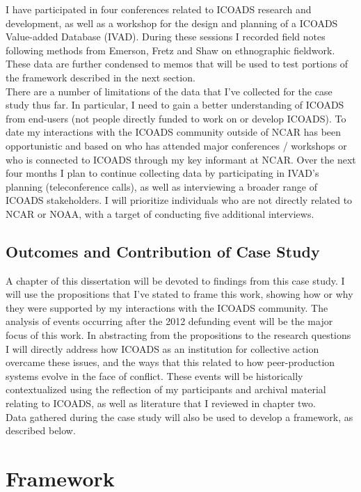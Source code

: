 \documentclass[thesis,tocnosub,noragright,centerchapter,12pt]{uiucecethesis09}
\begin{document}
{I have participated in four conferences related to ICOADS research and
development, as well as a workshop for the design and planning of a
ICOADS Value-added Database (IVAD). During these sessions I recorded
field notes following methods from Emerson, Fretz and Shaw \citeyearpar{emerson2011writing} on
ethnographic fieldwork. These data are further condensed to memos that
will be used to test portions of the framework described in the next
section.\\

There are a number of limitations of the data that I've collected for the case study thus far. In particular, I need to gain a better understanding of ICOADS from end-users (not people directly funded to work on or develop ICOADS). To date my interactions with the ICOADS community outside of NCAR has been opportunistic and based on who has attended major
conferences / workshops or who is connected to ICOADS through my key informant at NCAR. Over the next four months I plan to continue collecting data by participating in IVAD's planning (teleconference calls), as well as
interviewing a broader range of ICOADS stakeholders. I will
prioritize individuals who are not directly related to NCAR or NOAA, with a target of conducting five additional interviews.\\

\subsection*{Outcomes and Contribution of Case Study}
A chapter of this dissertation will be devoted to findings from this case study. I will use the propositions that I've stated to frame this work, showing how or why they were supported by my interactions with the ICOADS community. The analysis of events occurring after the 2012 defunding event will be the major focus of this work. In abstracting from the propositions to the research questions I will directly address how ICOADS as an institution for collective action overcame these issues, and the ways that this related to how peer-production systems evolve in the face of conflict. These events will be historically contextualized using the reflection of my participants and archival material relating to ICOADS, as well as literature that I reviewed in chapter two.\\ 

Data gathered during the case study will also be used to develop a framework, as described below. 

\section{Framework}

}
\end{document}
